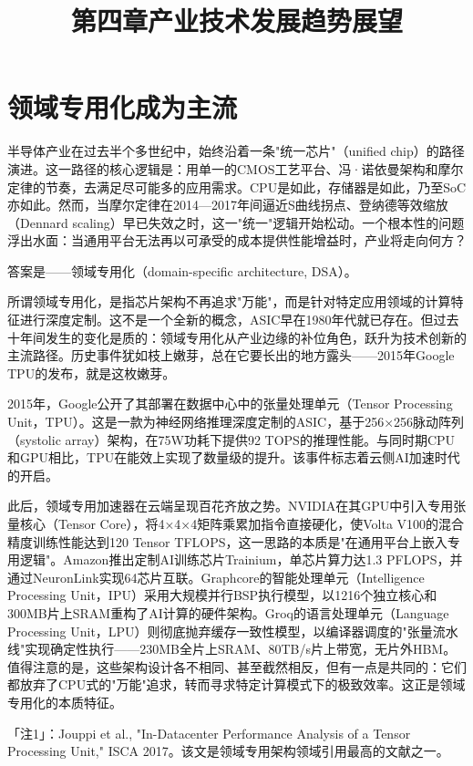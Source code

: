 \documentclass[11pt,a4paper]{article}
\title{\bfseries\large 第四章\quad 产业技术发展趋势展望}
\author{}
\date{}
\begin{document}
\maketitle

\section{领域专用化成为主流}

半导体产业在过去半个多世纪中，始终沿着一条"统一芯片"（unified chip）的路径演进。这一路径的核心逻辑是：用单一的CMOS工艺平台、冯·诺依曼架构和摩尔定律的节奏，去满足尽可能多的应用需求。CPU是如此，存储器是如此，乃至SoC亦如此。然而，当摩尔定律在2014—2017年间逼近S曲线拐点、登纳德等效缩放（Dennard scaling）早已失效之时，这一"统一"逻辑开始松动。一个根本性的问题浮出水面：当通用平台无法再以可承受的成本提供性能增益时，产业将走向何方？

答案是——领域专用化（domain-specific architecture, DSA）。

所谓领域专用化，是指芯片架构不再追求"万能"，而是针对特定应用领域的计算特征进行深度定制。这不是一个全新的概念，ASIC早在1980年代就已存在。但过去十年间发生的变化是质的：领域专用化从产业边缘的补位角色，跃升为技术创新的主流路径。历史事件犹如枝上嫩芽，总在它要长出的地方露头——2015年Google TPU的发布，就是这枚嫩芽。

2015年，Google公开了其部署在数据中心中的张量处理单元（Tensor Processing Unit，TPU）。这是一款为神经网络推理深度定制的ASIC，基于256×256脉动阵列（systolic array）架构，在75W功耗下提供92 TOPS的推理性能。与同时期CPU和GPU相比，TPU在能效上实现了数量级的提升。该事件标志着云侧AI加速时代的开启。

此后，领域专用加速器在云端呈现百花齐放之势。NVIDIA在其GPU中引入专用张量核心（Tensor Core），将4×4×4矩阵乘累加指令直接硬化，使Volta V100的混合精度训练性能达到120 Tensor TFLOPS，这一思路的本质是"在通用平台上嵌入专用逻辑"。Amazon推出定制AI训练芯片Trainium，单芯片算力达1.3 PFLOPS，并通过NeuronLink实现64芯片互联。Graphcore的智能处理单元（Intelligence Processing Unit，IPU）采用大规模并行BSP执行模型，以1216个独立核心和300MB片上SRAM重构了AI计算的硬件架构。Groq的语言处理单元（Language Processing Unit，LPU）则彻底抛弃缓存一致性模型，以编译器调度的"张量流水线"实现确定性执行——230MB全片上SRAM、80TB/s片上带宽，无片外HBM。值得注意的是，这些架构设计各不相同、甚至截然相反，但有一点是共同的：它们都放弃了CPU式的"万能"追求，转而寻求特定计算模式下的极致效率。这正是领域专用化的本质特征。

「注1」：Jouppi et al., "In-Datacenter Performance Analysis of a Tensor Processing Unit," ISCA 2017。该文是领域专用架构领域引用最高的文献之一。
\end{document}
